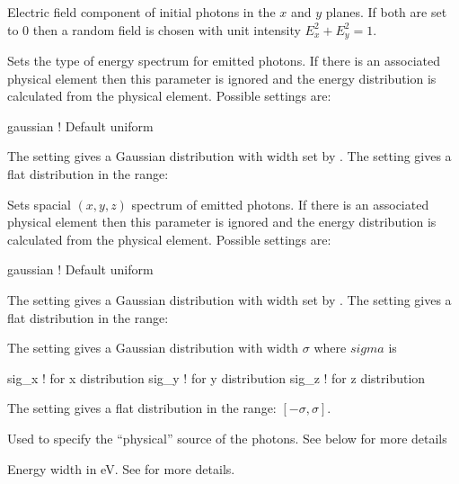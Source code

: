 {\begin{description}
  \item[\vn{e_field_x}, \vn{e_field_y}] \Newline
Electric field component of initial photons in the $x$ and $y$ planes.
If both are set to 0 then a random field is chosen with unit intensity
$E_x^2 + E_y^2 = 1$.

  \item[\vn{energy_distribution}] \Newline
Sets the type of energy spectrum for emitted photons. If there is an
associated physical element then this parameter is ignored and the
energy distribution is calculated from the physical element. Possible
settings are:
\begin{example2}
  gaussian   ! Default
  uniform
\end{example2}
The  setting gives a Gaussian distribution with width
set by . The  setting gives a flat
distribution in the range:
\begin{example2}
\end{example2}

  \item[\vn{spatial_distribution}] \Newline
Sets spacial $(x, y, z)$ spectrum of emitted photons. If there is an
associated physical element then this parameter is ignored and the
energy distribution is calculated from the physical element. Possible
settings are:
\begin{example2}
  gaussian    ! Default
  uniform
\end{example2}
The  setting gives a Gaussian distribution with width
set by . The  setting gives a flat
distribution in the range:
\begin{example2}
\end{example2}
The  setting gives a Gaussian distribution with width
$\sigma$ where $sigma$ is 
\begin{example2}
  sig_x     ! for x distribution
  sig_y     ! for y distribution
  sig_z     ! for z distribution
\end{example2}
The  setting gives a flat
distribution in the range: $[-\sigma, \sigma]$.

  \item[\vn{physical_source}] \Newline
Used to specify the ``physical'' source of the photons. See below for more details

  \item[\vn{sig_E}] \Newline
Energy width in eV. See  for more
details.


\end{description}}
